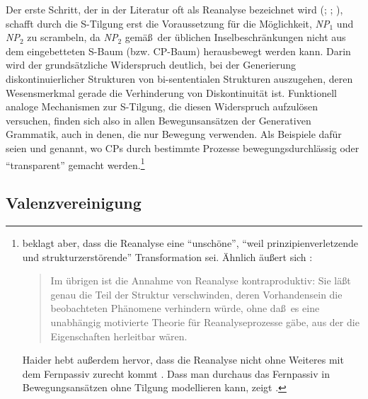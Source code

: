 Der erste Schritt, der in der Literatur oft als Reanalyse bezeichnet wird (\citealt{Haegeman:Riemsdijk:86}; \citealt[Kapitel~12]{Stechow:Sternefeld:88}; \citealt{Stechow:90}), schafft durch die S-Tilgung erst die Voraussetzung für die Möglichkeit, {\it NP$_1$} und {\it NP$_2$} zu scrambeln, da {\it NP$_2$} gemä\ss\ der üblichen Inselbeschränkungen nicht aus dem eingebetteten S-Baum (bzw. CP-Baum) herausbewegt werden kann. Darin wird der grundsätzliche Widerspruch deutlich, bei der Generierung diskontinuierlicher Strukturen von bi-sententialen Strukturen auszugehen, deren Wesensmerkmal gerade die Verhinderung von Diskontinuität ist. Funktionell analoge Mechanismen zur S-Tilgung, die diesen Widerspruch aufzulösen versuchen, finden sich also in allen Bewegunsansätzen der Generativen Grammatik, auch in denen, die nur Bewegung verwenden. Als Beispiele dafür seien \cite{Grewendorf:Sabel:94} und \cite{Sabel:96} genannt, wo CPs durch bestimmte Prozesse bewegungsdurchlässig oder "`transparent"' gemacht werden.\footnote{\citet[102]{Jacobs:92} beklagt aber, dass die Reanalyse eine "`unschöne"', "`weil prinzipienverletzende und strukturzerstörende"' Transformation sei. Ähnlich äu\ss ert sich \cite[257]{Haider:93}:
\begin{quote}
Im übrigen ist die Annahme von Reanalyse kontraproduktiv: Sie lä\ss t genau die Teil der Struktur verschwinden, deren Vorhandensein die beobachteten Phänomene verhindern würde, ohne da\ss\ es eine unabhängig motivierte Theorie für Reanalyseprozesse gäbe, aus der die Eigenschaften herleitbar wären.
\end{quote}
Haider hebt au\ss erdem hervor, dass die Reanalyse nicht ohne Weiteres mit dem Fernpassiv zurecht kommt \citep[254]{Haider:93}. Dass man durchaus das Fernpassiv in Bewegungsansätzen ohne Tilgung modellieren kann, zeigt \citet[204ff]{Sabel:96}.}   


\subsection{Valenzvereinigung} \label{sec:valenzvereinigung}

